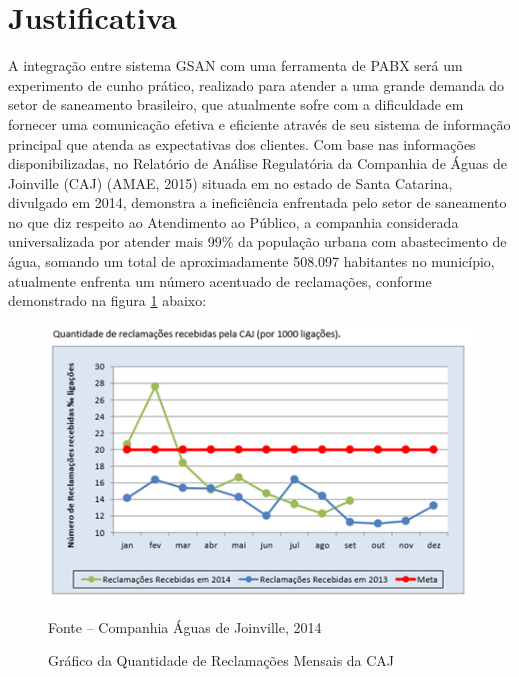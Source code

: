 \section{Justificativa}
A integração entre sistema GSAN com uma ferramenta de PABX será um experimento de cunho prático, realizado para atender a uma grande demanda do setor de saneamento brasileiro, que atualmente sofre com a dificuldade em fornecer uma comunicação efetiva e eficiente através de seu sistema de informação principal que atenda as expectativas dos clientes.
Com base nas informações disponibilizadas, no Relatório de Análise Regulatória da Companhia de Águas de Joinville (CAJ) (AMAE, 2015) situada em no estado de Santa Catarina, divulgado em 2014, demonstra a ineficiência enfrentada pelo setor de saneamento no que diz respeito ao Atendimento ao Público, a companhia considerada universalizada por atender mais 99\% da população urbana com abastecimento de água, somando um total de aproximadamente 508.097 habitantes no município, atualmente enfrenta um número acentuado de reclamações, conforme demonstrado na figura \ref{figura:ligacoesReclamacoes} abaixo:
 

\begin{figure}[!htb]
	\centering
	\includegraphics{figuras/LigacoesReclamacoes.png}
	\caption{Gráfico da Quantidade de Reclamações Mensais da CAJ} \label{figura:ligacoesReclamacoes}	
	Fonte – Companhia Águas de Joinville, 2014
\end{figure}


